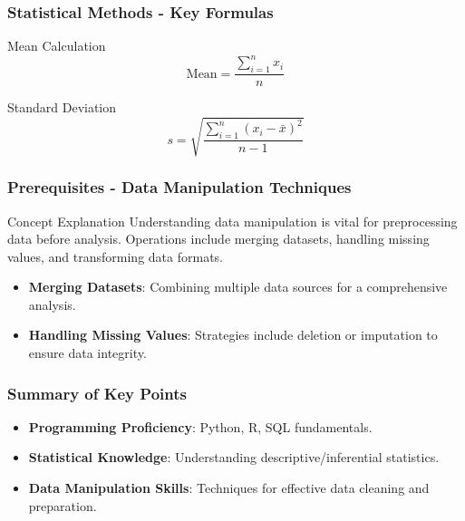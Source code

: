 \documentclass[aspectratio=169]{beamer}
\begin{document}
\begin{frame}[fragile]
    \frametitle{Statistical Methods - Key Formulas}
    
    \begin{block}{Mean Calculation}
    \begin{equation}
    \text{Mean} = \frac{\sum_{i=1}^{n} x_i}{n}
    \end{equation}
    \end{block}

    \begin{block}{Standard Deviation}
    \begin{equation}
    s = \sqrt{\frac{\sum_{i=1}^{n}(x_i - \bar{x})^2}{n-1}}
    \end{equation}
    \end{block}
\end{frame}

\begin{frame}
    \frametitle{Prerequisites - Data Manipulation Techniques}
    
    \begin{block}{Concept Explanation}
        Understanding data manipulation is vital for preprocessing data before analysis. Operations include merging datasets, handling missing values, and transforming data formats.
    \end{block}

    \begin{itemize}
        \item \textbf{Merging Datasets}: Combining multiple data sources for a comprehensive analysis.
        \item \textbf{Handling Missing Values}: Strategies include deletion or imputation to ensure data integrity.
    \end{itemize}
\end{frame}

\begin{frame}
    \frametitle{Summary of Key Points}
    
    \begin{itemize}
        \item \textbf{Programming Proficiency}: Python, R, SQL fundamentals.
        \item \textbf{Statistical Knowledge}: Understanding descriptive/inferential statistics.
        \item \textbf{Data Manipulation Skills}: Techniques for effective data cleaning and preparation.
    \end{itemize}
\end{frame}
\end{document}
